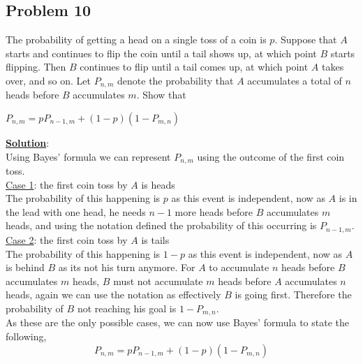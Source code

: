 \documentclass[11pt,letter paper]{report}
\begin{document}
\subsection*{Problem 10}
The probability of getting a head on a single toss of a coin is $p$. Suppose that $A$ starts and continues to flip the coin until a tail shows up, at which point $B$ starts flipping. Then $B$ continues to flip until a tail comes up, at which point $A$ takes over, and so on. Let $P_{n,m}$ denote the probability that $A$ accumulates a total of $n$ heads before $B$ accumulates $m$. Show that
\begin{center}
$P_{n,m}=pP_{n-1,m}+(1-p)(1-P_{m,n})$
\end{center}
{\bf \underline{Solution}}:\\
Using Bayes' formula we can represent $P_{n,m}$ using the outcome of the first coin toss.\\
\underline{Case 1}: the first coin toss by $A$ is heads\\
The probability of this happening is $p$ as this event is independent, now as $A$ is in the lead with one head, he needs $n-1$ more heads before $B$ accumulates $m$ heads, and using the notation defined the probability of this occurring is $P_{n-1,m}$.\\
\underline{Case 2}: the first coin toss by $A$ is tails\\
The probability of this happening is $1-p$ as this event is independent, now as $A$ is behind $B$ as its not his turn anymore. For $A$ to accumulate $n$ heads before $B$ accumulates $m$ heads, $B$ must not accumulate $m$ heads before $A$ accumulates $n$ heads, again we can use the notation as effectively $B$ is going first. Therefore the probability of $B$ not reaching his goal is $1-P_{m,n}$.\\
As these are the only possible cases, we can now use Bayes' formula to state the following, $$P_{n,m}=pP_{n-1,m}+(1-p)(1-P_{m,n})$$
\end{document}
